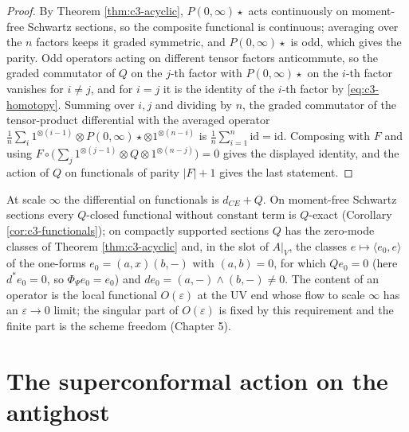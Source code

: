 \begin{proof}
By Theorem \ref{thm:c3-acyclic}, $P(0,\infty)\star$ acts continuously on moment-free Schwartz sections, so the composite functional is continuous; averaging over the $n$ factors keeps it graded symmetric, and $P(0,\infty)\star$ is odd, which gives the parity. Odd operators acting on different tensor factors anticommute, so the graded commutator of $Q$ on the $j$-th factor with $P(0,\infty)\star$ on the $i$-th factor vanishes for $i\neq j$, and for $i=j$ it is the identity of the $i$-th factor by \eqref{eq:c3-homotopy}. Summing over $i,j$ and dividing by $n$, the graded commutator of the tensor-product differential with the averaged operator $\frac1n\sum_i1^{\otimes(i-1)}\otimes P(0,\infty)\star\otimes1^{\otimes(n-i)}$ is $\frac1n\sum_{i=1}^n\mathrm{id}=\mathrm{id}$. Composing with $F$ and using $F\circ\big(\sum_j1^{\otimes(j-1)}\otimes Q\otimes1^{\otimes(n-j)}\big)=0$ gives the displayed identity, and the action of $Q$ on functionals of parity $|F|+1$ gives the last statement.
\end{proof}

\begin{remark}
\label{rem:c3-story}
At scale $\infty$ the differential on functionals is $d_{CE}+Q$. On moment-free Schwartz sections every $Q$-closed functional without constant term is $Q$-exact (Corollary \ref{cor:c3-functionals}); on compactly supported sections $Q$ has the zero-mode classes of Theorem \ref{thm:c3-acyclic} and, in the slot of $A|_V$, the classes $e\mapsto\langle e_0,e\rangle$ of the one-forms $e_0=(a,x)(b,-)$ with $(a,b)=0$, for which $Q e_0=0$ (here $d^*e_0=0$, so $\Phi_\Psi e_0=e_0$) and $de_0=(a,-)\wedge(b,-)\neq0$. The content of an operator is the local functional $O(\varepsilon)$ at the UV end whose flow to scale $\infty$ has an $\varepsilon\to0$ limit; the singular part of $O(\varepsilon)$ is fixed by this requirement and the finite part is the scheme freedom (Chapter 5).
\end{remark}

\section{The superconformal action on the antighost}

